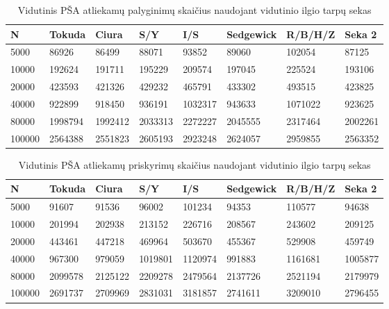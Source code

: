\documentclass{VUMIFInfKursinis}
\begin{document}
\begin{table}[H]
  \caption{Vidutinis PŠA atliekamų palyginimų skaičius naudojant vidutinio ilgio tarpų sekas}
  \begin{tabular}{|l|l|l|l|l|l|l|l|}
  \hline
  N      & Tokuda  & Ciura   & S/Y     & I/S     & Sedgewick & R/B/H/Z & Seka 2     \\ \hline
  5000   & 86926   & 86499   & 88071   & 93852   & 89060     & 102054  & 87125   \\ \hline
  10000  & 192624  & 191711  & 195229  & 209574  & 197045    & 225524  & 193106  \\ \hline
  20000  & 423593  & 421326  & 429232  & 465791  & 433302    & 493515  & 423825  \\ \hline
  40000  & 922899  & 918450  & 936191  & 1032317 & 943633    & 1071022 & 923625  \\ \hline
  80000  & 1998794 & 1992412 & 2033313 & 2272227 & 2045555   & 2317464 & 2002261 \\ \hline
  100000 & 2564388 & 2551823 & 2605193 & 2923248 & 2624057   & 2959855 & 2563352 \\ \hline
  \end{tabular}
  \end{table}

\begin{table}[H]
  \caption{Vidutinis PŠA atliekamų priskyrimų skaičius naudojant vidutinio ilgio tarpų sekas}
  \begin{tabular}{|l|l|l|l|l|l|l|l|}
  \hline
  N      & Tokuda  & Ciura   & S/Y     & I/S     & Sedgewick & R/B/H/Z & Seka 2     \\ \hline
  5000   & 91607   & 91536   & 96002   & 101234  & 94353     & 110577  & 94638   \\ \hline
  10000  & 201994  & 202938  & 213152  & 226716  & 208567    & 243602  & 209125  \\ \hline
  20000  & 443461  & 447218  & 469964  & 503670  & 455367    & 529908  & 459749  \\ \hline
  40000  & 967300  & 979059  & 1019801 & 1120974 & 991883    & 1161681 & 1005877 \\ \hline
  80000  & 2099578 & 2125122 & 2209278 & 2479564 & 2137726   & 2521194 & 2179979 \\ \hline
  100000 & 2691737 & 2709969 & 2831031 & 3181857 & 2741611   & 3209010 & 2796455 \\ \hline
  \end{tabular}
  \end{table}
\end{document}
